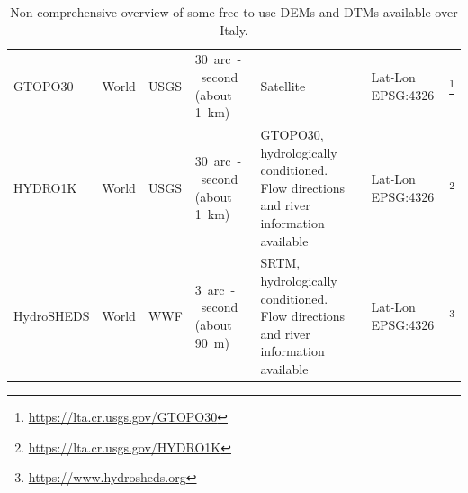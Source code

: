 \begin{table}
\begin{tabular}{@{}m{2.5cm}lm{2.2cm}m{2.4cm}m{5cm}m{2.1cm}m{5cm}@{}}
GTOPO30 & World  & USGS & \SI{30}{arc-second} (about \SI{1}{\kilo\metre}) & Satellite & Lat-Lon EPSG:4326 & \citet{USGS1996} \footnote{\url{https://lta.cr.usgs.gov/GTOPO30}} \\

HYDRO1K & World & USGS & \SI{30}{arc-second} (about \SI{1}{\kilo\metre}) & GTOPO30, hydrologically conditioned. Flow directions and river information available & Lat-Lon EPSG:4326 & \citet{USGS1996} \footnote{\url{https://lta.cr.usgs.gov/HYDRO1K}} \\

HydroSHEDS & World  & WWF  & \SI{3}{arc-second} (about \SI{90}{\metre})   & SRTM, hydrologically conditioned. Flow directions and river information available & Lat-Lon EPSG:4326 & \citet{Lehner2008, Lehner2013} \footnote{\url{https://www.hydrosheds.org}} \\ \bottomrule
\end{tabular}\caption[List of DEMs over Italy]{Non comprehensive overview of some free-to-use DEMs and DTMs available over Italy.}\label{tab:DEMs}
\end{table}

